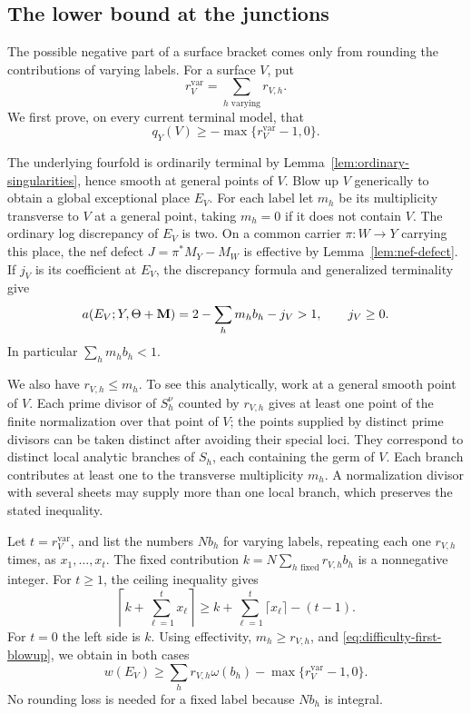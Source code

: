\subsection{The lower bound at the junctions}

The possible negative part of a surface bracket comes only from rounding
the contributions of varying labels.  For a surface \(V\), put
\[
 r_V^{\mathrm{var}}=\sum_{h\text{ varying}}r_{V,h}.
\]
We first prove, on every current terminal model, that
\begin{equation}\label{eq:difficulty-local-bound}
 q_Y(V)\geq-\max\{r_V^{\mathrm{var}}-1,0\}.
\end{equation}

The underlying fourfold is ordinarily terminal by
Lemma~\ref{lem:ordinary-singularities}, hence smooth at general points of
\(V\).  Blow up \(V\) generically to obtain a global exceptional
place \(E_V\).  For each label let \(m_h\) be its multiplicity transverse
to \(V\) at a general point, taking \(m_h=0\) if it does not contain
\(V\).  The ordinary log discrepancy of \(E_V\) is two.  On a common
carrier \(\pi:W\to Y\) carrying this place, the nef defect
\(J=\pi^*M_Y-M_W\) is effective by Lemma~\ref{lem:nef-defect}.  If \(j_V\) is its coefficient at
\(E_V\), the discrepancy formula and generalized terminality give
\begin{equation}\label{eq:difficulty-first-blowup}
 a(E_V;Y,\Theta+\mathbf{M})=2-\sum_hm_hb_h-j_V>1,
 \qquad j_V\geq0.
\end{equation}
In particular \(\sum_hm_hb_h<1\).

We also have \(r_{V,h}\leq m_h\).  To see this analytically, work at a
general smooth point of \(V\).  Each prime divisor of \(S_h^\nu\) counted
by \(r_{V,h}\) gives at least one point of the finite normalization over
that point of \(V\); the points supplied by distinct prime divisors can be
taken distinct after avoiding their special loci.  They correspond to
distinct local analytic branches of \(S_h\), each containing the germ of
\(V\).  Each branch contributes at least one to the transverse multiplicity
\(m_h\).  A normalization divisor with several sheets may supply more
than one local branch, which preserves the stated inequality.

Let \(t=r_V^{\mathrm{var}}\), and list the numbers \(Nb_h\) for varying
labels, repeating each one \(r_{V,h}\) times, as
\(x_1,\ldots,x_t\).  The fixed contribution
\(k=N\sum_{h\text{ fixed}}r_{V,h}b_h\) is a nonnegative integer.  For
\(t\geq1\), the ceiling inequality gives
\[
 \left\lceil k+\sum_{\ell=1}^t x_\ell\right\rceil
 \geq k+\sum_{\ell=1}^t\lceil x_\ell\rceil-(t-1).
\]
For \(t=0\) the left side is \(k\).  Using effectivity,
\(m_h\geq r_{V,h}\), and \eqref{eq:difficulty-first-blowup}, we obtain in
both cases
\begin{equation}\label{eq:difficulty-first-weight}
 w(E_V)\geq\sum_h r_{V,h}\omega(b_h)
              -\max\{r_V^{\mathrm{var}}-1,0\}.
\end{equation}
No rounding loss is needed for a fixed label because \(Nb_h\) is integral.

